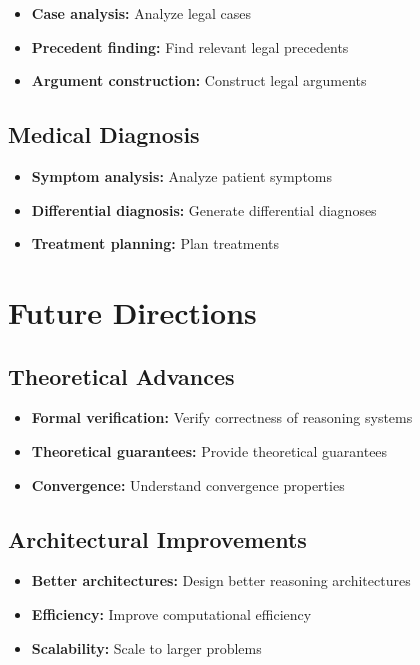 \begin{itemize}
    \item \textbf{Case analysis:} Analyze legal cases
    \item \textbf{Precedent finding:} Find relevant legal precedents
    \item \textbf{Argument construction:} Construct legal arguments
\end{itemize}

\subsection{Medical Diagnosis}

\begin{itemize}
    \item \textbf{Symptom analysis:} Analyze patient symptoms
    \item \textbf{Differential diagnosis:} Generate differential diagnoses
    \item \textbf{Treatment planning:} Plan treatments
\end{itemize}

\section{Future Directions}

\subsection{Theoretical Advances}

\begin{itemize}
    \item \textbf{Formal verification:} Verify correctness of reasoning systems
    \item \textbf{Theoretical guarantees:} Provide theoretical guarantees
    \item \textbf{Convergence:} Understand convergence properties
\end{itemize}

\subsection{Architectural Improvements}

\begin{itemize}
    \item \textbf{Better architectures:} Design better reasoning architectures
    \item \textbf{Efficiency:} Improve computational efficiency
    \item \textbf{Scalability:} Scale to larger problems
\end{itemize}

